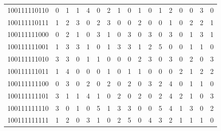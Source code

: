 \documentclass[10pt,a4paper]{article}
\begin{document}
\begin{longtable}{ |c|c|c|c|c|c|c|c|c|c|c|c|c|c|c|c|c| }
    100111110110              & 0                            & 1                                & 1                            & 4                              & 0   & 2   & 1   & 0   & 1   & 0   & 1   & 2   & 0   & 0   & 3   & 0   \\
    100111110111              & 1                            & 2                                & 3                            & 0                              & 2   & 3   & 0   & 0   & 2   & 0   & 0   & 1   & 0   & 2   & 2   & 1   \\
    100111111000              & 0                            & 2                                & 1                            & 0                              & 3   & 1   & 0   & 3   & 0   & 3   & 0   & 3   & 0   & 1   & 3   & 1   \\
    100111111001              & 1                            & 3                                & 3                            & 1                              & 0   & 1   & 3   & 3   & 1   & 2   & 5   & 0   & 0   & 1   & 1   & 0   \\
    100111111010              & 3                            & 3                                & 0                            & 1                              & 1   & 0   & 0   & 0   & 2   & 3   & 0   & 3   & 0   & 2   & 0   & 3   \\
    100111111011              & 1                            & 4                                & 0                            & 0                              & 0   & 1   & 0   & 1   & 1   & 0   & 0   & 0   & 2   & 1   & 2   & 2   \\
    100111111100              & 0                            & 3                                & 0                            & 2                              & 0   & 2   & 0   & 2   & 0   & 3   & 2   & 4   & 0   & 1   & 1   & 0   \\
    100111111101              & 3                            & 1                                & 1                            & 4                              & 1   & 0   & 2   & 0   & 2   & 0   & 2   & 4   & 2   & 1   & 0   & 3   \\
    100111111110              & 3                            & 0                                & 1                            & 0                              & 5   & 1   & 3   & 3   & 0   & 0   & 5   & 4   & 1   & 3   & 0   & 2   \\
    100111111111              & 1                            & 2                                & 0                            & 3                              & 1   & 0   & 2   & 5   & 0   & 4   & 3   & 2   & 1   & 1   & 1   & 0   \\

\end{longtable}
\end{document}
